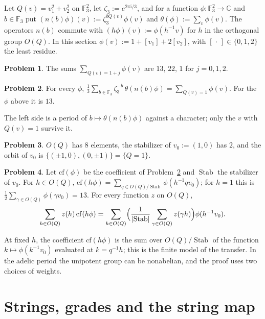 \documentclass[reqno]{amsart}
\theoremstyle{definition}
\newtheorem{problem}{Problem}[section]
\theoremstyle{plain}
\theoremstyle{remark}
\newcommand{\C}{\mathbb{C}}
\newcommand{\F}{\mathbb{F}}
\newcommand{\ii}{\mathrm{i}}
\newcommand{\Stab}{\operatorname{Stab}}
\begin{document}
Let \(Q(v)=v_1^2+v_2^2\) on \(\F_3^2\), let \(\zeta_3:=e^{2\pi\ii/3}\), and for a function \(\phi\colon\F_3^2\to\C\) and \(b\in\F_3\) put \((n(b)\phi)(v):=\zeta_3^{bQ(v)}\phi(v)\) and \(\theta(\phi):=\sum_v\phi(v)\).  The operators \(n(b)\) commute with \((h\phi)(v):=\phi(h^{-1}v)\) for \(h\) in the orthogonal group \(O(Q)\).  In this section \(\phi(v):=1+[v_1]+2[v_2]\), with \([\,\cdot\,]\in\{0,1,2\}\) the least residue.

\begin{problem}\label{pr:buckets}
The sums \(\sum_{Q(v)=1+j}\phi(v)\) are \(13\), \(22\), \(1\) for \(j=0,1,2\).
\end{problem}

\begin{problem}\label{pr:coefficient}
For every \(\phi\), \(\frac13\sum_{b\in\F_3}\zeta_3^{-b}\,\theta(n(b)\phi)=\sum_{Q(v)=1}\phi(v)\).  For the \(\phi\) above it is \(13\).
\end{problem}

The left side is a period of \(b\mapsto\theta(n(b)\phi)\) against a character; only the \(v\) with \(Q(v)=1\) survive it.

\begin{problem}\label{pr:plane-orbit}
\(O(Q)\) has \(8\) elements, the stabilizer of \(v_0:=(1,0)\) has \(2\), and the orbit of \(v_0\) is \(\{(\pm1,0),(0,\pm1)\}=\{Q=1\}\).
\end{problem}

\begin{problem}\label{pr:plane-unfold}
Let \(\mathrm{cf}(\phi)\) be the coefficient of Problem~\ref{pr:coefficient} and \(\Stab\) the stabilizer of \(v_0\).  For \(h\in O(Q)\), \(\mathrm{cf}(h\phi)=\sum_{q\in O(Q)/\Stab}\phi(h^{-1}qv_0)\); for \(h=1\) this is \(\frac12\sum_{\gamma\in O(Q)}\phi(\gamma v_0)=13\).  For every function \(z\) on \(O(Q)\),
\[
  \sum_{h\in O(Q)}z(h)\,\mathrm{cf}(h\phi)=\sum_{h\in O(Q)}\Bigl(\frac{1}{\lvert\Stab\rvert}\sum_{\gamma\in O(Q)}z(\gamma h)\Bigr)\phi(h^{-1}v_0).
\]
\end{problem}

At fixed \(h\), the coefficient \(\mathrm{cf}(h\phi)\) is the sum over \(O(Q)/\Stab\) of the function \(k\mapsto\phi(k^{-1}v_0)\) evaluated at \(k=q^{-1}h\); this is the finite model of the transfer.  In the adelic period the unipotent group can be nonabelian, and the proof uses two choices of weights.


\section{Strings, grades and the string map}\label{sec:strings}
\end{document}
